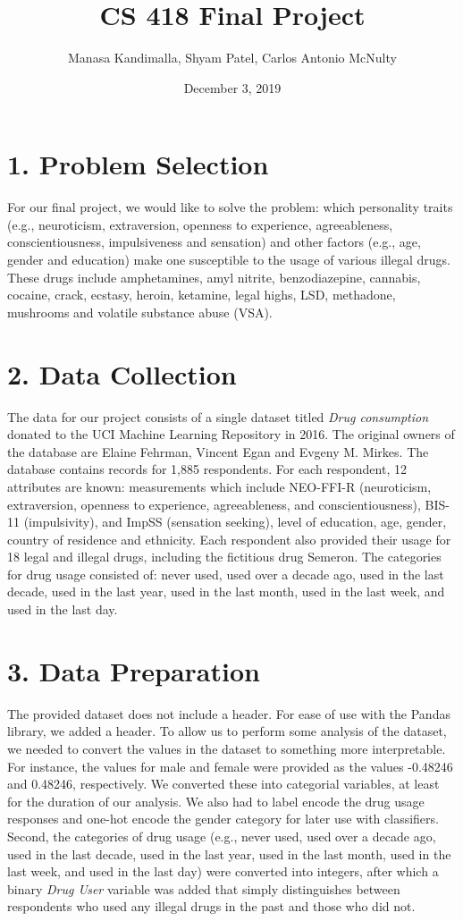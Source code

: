 \documentclass[10pt]{article}
\title{CS 418 Final Project}
\date{December 3, 2019}
\author {Manasa Kandimalla, Shyam Patel, Carlos Antonio McNulty}
\begin{document}
\maketitle

\section*{1. Problem Selection}

For our final project, we would like to solve the problem: which personality traits (e.g., neuroticism, extraversion, openness to experience, agreeableness, conscientiousness, impulsiveness and sensation) and other factors (e.g., age, gender and education) make one susceptible to the usage of various illegal drugs. These drugs include amphetamines, amyl nitrite, benzodiazepine, cannabis, cocaine, crack, ecstasy, heroin, ketamine, legal highs, LSD, methadone, mushrooms and volatile substance abuse (VSA).


\section*{2. Data Collection}

The data for our project consists of a single dataset titled \textit{Drug consumption} donated to the UCI Machine Learning Repository in 2016. The original owners of the database are Elaine Fehrman, Vincent Egan and Evgeny M. Mirkes. The database contains records for 1,885 respondents. For each respondent, 12 attributes are known: measurements which include NEO-FFI-R (neuroticism, extraversion, openness to experience, agreeableness, and conscientiousness), BIS-11 (impulsivity), and ImpSS (sensation seeking), level of education, age, gender, country of residence and ethnicity. Each respondent also provided their usage for 18 legal and illegal drugs, including the fictitious drug Semeron. The categories for drug usage consisted of: never used, used over a decade ago, used in the last decade, used in the last year, used in the last month, used in the last week, and used in the last day.

\section*{3. Data Preparation}

The provided dataset does not include a header. For ease of use with the Pandas library, we added a header. To allow us to perform some analysis of the dataset, we needed to convert the values in the dataset to something more interpretable. For instance, the values for male and female were provided as the values -0.48246 and 0.48246, respectively. We converted these into categorial variables, at least for the duration of our analysis. We also had to label encode the drug usage responses and one-hot encode the gender category for later use with classifiers. Second, the categories of drug usage (e.g., never used, used over a decade ago, used in the last decade, used in the last year, used in the last month, used in the last week, and used in the last day) were converted into integers, after which a binary \textit{Drug User} variable was added that simply distinguishes between respondents who used any illegal drugs in the past and those who did not.
\end{document}
